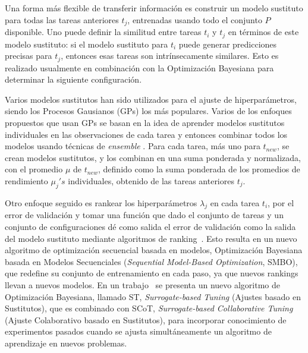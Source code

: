 \quad

Una forma más flexible de transferir información es construir un modelo sustituto para todas las tareas anteriores $t_j$, entrenadas usando todo el conjunto $P$ disponible. Uno puede definir la similitud entre tareas $t_i$ y $t_j$ en términos de este modelo sustituto: si el modelo sustituto para $t_i$ puede generar predicciones precisas para $t_{j}$, entonces esas tareas son intrínsecamente similares. Esto es realizado usualmente en combinación con la Optimización Bayesiana para determinar la siguiente configuración. 


Varios modelos sustitutos han sido utilizados para el ajuste de hiperparámetros, siendo los Procesos Gausianos (GPs) los más populares. Varios de los enfoques propuestos que usan GPs se basan en la idea de aprender modelos sustitutos individuales en las observaciones de cada tarea y entonces combinar todos los modelos usando técnicas de \textit{ensemble} \cite{witsuba2015learning, witsuba2018scalable}. Para cada tarea, más uno para $t_{new}$, se crean modelos sustitutos, y los combinan en una suma ponderada y normalizada, con el promedio $\mu$ de $t_{new}$, definido como la suma ponderada de los promedios de rendimiento $\mu_j's$ individuales, obtenido de las tareas anteriores $t_j$. 

Otro enfoque seguido es rankear los hiperparámetros $\lambda_j$ en cada tarea $t_i$, por el error de validación %
y tomar una función que dado el conjunto de tareas y un conjunto de configuraciones dé como salida el error de validación como la salida del modelo sustituto mediante algoritmos de ranking~\cite{bardenet2013hyper, yogatama2014efficient}. Esto resulta en un nuevo algoritmo de optimización secuencial basada en modelos, Optimización Bayesiana basada en Modelos Secuenciales (\textit{Sequential Model-Based Optimization}, SMBO), que redefine su conjunto de entrenamiento en cada paso, ya que nuevos rankings llevan a nuevos modelos. En un trabajo~\cite{bardenet2013hyper} se presenta un nuevo algoritmo de Optimización Bayesiana, llamado ST, \textit{Surrogate-based Tuning} (Ajustes basado en Sustitutos), que es combinado con SCoT, \textit{Surrogate-based Collaborative Tuning} (Ajuste Colaborativo basado en Sustitutos), para incorporar conocimiento de experimentos pasados cuando se ajusta simultáneamente un algoritmo de aprendizaje en nuevos problemas.

